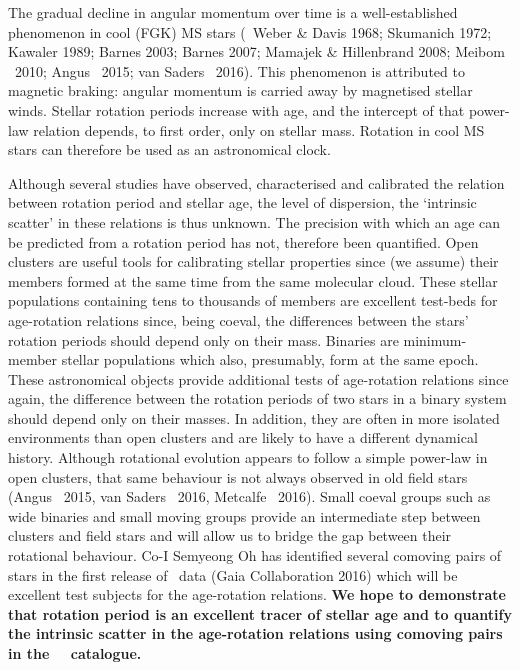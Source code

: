 \justification
The gradual decline in angular momentum over time is a well-established
phenomenon in cool (FGK) MS stars (\eg\ Weber \& Davis 1968;
Skumanich 1972; Kawaler 1989; Barnes 2003; Barnes 2007; Mamajek \&
Hillenbrand 2008; Meibom \etal\ 2010; Angus \etal\ 2015; van Saders \etal\
2016).
This phenomenon is attributed to magnetic braking: angular momentum is carried
away by magnetised stellar winds.
Stellar rotation periods increase with age, and the intercept of that
power-law relation depends, to first order, only on stellar mass.
Rotation in cool MS stars can therefore be used as an astronomical clock.

Although several studies have observed, characterised and calibrated the
relation between rotation period and stellar age, the level of dispersion, the
`intrinsic scatter' in these relations is thus unknown.
The precision with which an age can be predicted from a rotation period has
not, therefore been quantified.
Open clusters are useful tools for calibrating stellar properties since (we
assume) their members formed at the same time from the same molecular cloud.
These stellar populations containing tens to thousands of members are
excellent test-beds for age-rotation relations since, being coeval, the
differences between the stars' rotation periods should depend only on their
mass.
Binaries are minimum-member stellar populations which also, presumably, form
at the same epoch.
These astronomical objects provide additional tests of age-rotation relations
since again, the difference between the rotation periods of two stars in a
binary system should depend only on their masses.
In addition, they are often in more isolated environments than open clusters
and are likely to have a different dynamical history.
Although rotational evolution appears to follow a simple power-law in open
clusters, that same behaviour is not always observed in old field stars (Angus
\etal\ 2015, van Saders \etal\ 2016, Metcalfe \etal\ 2016).
Small coeval groups such as wide binaries and small moving groups provide an
intermediate step between clusters and field stars and will allow us to bridge
the gap between their rotational behaviour.
Co-I Semyeong Oh has identified several comoving pairs of stars in the first
release of \gaia\ data (Gaia Collaboration 2016) which will be excellent test
subjects for the age-rotation relations.
{\bf We hope to demonstrate that rotation period is an excellent tracer of
stellar age and to quantify the intrinsic scatter in the age-rotation
relations using comoving pairs in the \Gaia\ \TGAS\ catalogue.}

